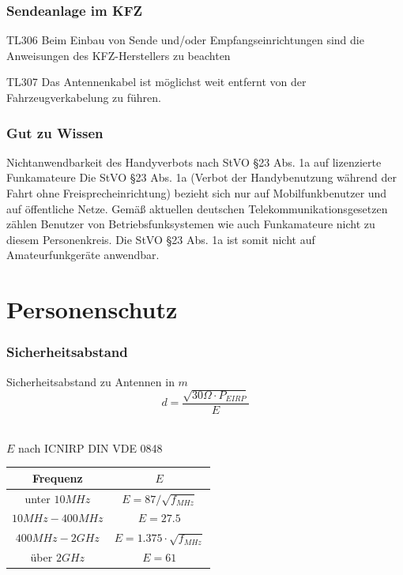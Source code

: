 \begin{frame}
    \frametitle{Sendeanlage im KFZ}
    \begin{center}
	\begin{block}{TL306}
		Beim Einbau von Sende und/oder Empfangseinrichtungen sind die Anweisungen des KFZ-Herstellers zu beachten
	\end{block}
	\begin{block}{TL307}
		Das Antennenkabel ist möglichst weit entfernt von der Fahrzeugverkabelung zu führen.
	\end{block}
    \end{center}
\end{frame}

\begin{frame}
    \frametitle{Gut zu Wissen}
    \begin{center}
	\begin{block}{Nichtanwendbarkeit des Handyverbots nach StVO §23 Abs. 1a auf lizenzierte Funkamateure}
		Die StVO §23 Abs. 1a (Verbot der Handybenutzung während der Fahrt ohne Freisprecheinrichtung) bezieht sich nur auf Mobilfunkbenutzer und auf öffentliche Netze. Gemäß aktuellen deutschen Telekommunikationsgesetzen zählen Benutzer von Betriebsfunksystemen wie auch Funkamateure nicht zu diesem Personenkreis. Die StVO §23 Abs. 1a ist somit nicht auf Amateurfunkgeräte anwendbar.
	\end{block}
    \end{center}
\end{frame}

\section*{Personenschutz}

\begin{frame}
    \frametitle{Sicherheitsabstand}
    \begin{center}
	\begin{block}{Sicherheitsabstand zu Antennen in $m$}   
		$$d = \frac{\sqrt{30\Omega \cdot P_{EIRP}}}{E}$$ \\[3em]     \begin{center}
		$E$ nach ICNIRP DIN VDE 0848 \\[1em]
	\begin{tabular}{c|c}
  		Frequenz & $E$ \\ \hline \hline
  		unter $10MHz$ & $E = 87 / \sqrt{f_{MHz}}$ \\ \hline
  		$10MHz - 400 MHz$ & $E = 27.5$ \\ \hline
  		$400MHz - 2GHz$ & $E = 1.375 \cdot \sqrt{f_{MHz}}$ \\ \hline
  		über $2GHz$ & $E = 61$ 
 	\end{tabular} \end{center}
	\end{block}
    \end{center}
\end{frame}

